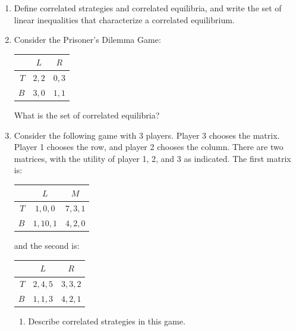 \documentclass[11pt,english]{article}
\begin{document}
\begin{enumerate}
    \item[(1)] Define correlated strategies and correlated equilibria, and
        write the set of linear inequalities that characterize a correlated
        equilibrium.
    \begin{solution}
 
    \end{solution}
 
    \item[(2)] Consider the Prisoner's Dilemma Game:
        \begin{center}
        \begin{tabular}{r|cc}
                & $L$   & $R$   \\
        \hline
        $T$     & $2,2$ & $0,3$ \\
        $B$     & $3,0$ & $1,1$
        \end{tabular}
        \end{center}
        What is the set of correlated equilibria?
    \begin{solution}
 
    \end{solution}
 
    \item[(3)] Consider the following game with 3 players. Player 3 chooses
        the matrix. Player 1 chooses the row, and player 2 chooses the column.
        There are two matrices, with the utility of player 1, 2, and 3 as
        indicated. The first matrix is:
        \begin{center}
        \begin{tabular}{r|cc}
                & $L$        & $M$       \\
        \hline
        $T$     & $1,0,0$    & $7,3,1$   \\
        $B$     & $1,10,1$   & $4,2,0$
        \end{tabular}
        \end{center}
        and the second is:
        \begin{center}
        \begin{tabular}{r|cc}
                & $L$        & $R$       \\
        \hline
        $T$     & $2,4,5$    & $3,3,2$   \\
        $B$     & $1,1,3$    & $4,2,1$
        \end{tabular}
        \end{center}
    \begin{enumerate}
        \item[(a)] Describe correlated strategies in this game.
        \begin{solution}
 

\end{solution}
\end{enumerate}
\end{enumerate}
\end{document}
